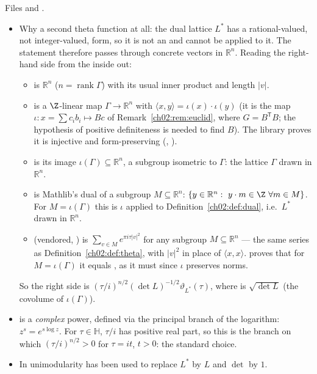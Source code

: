 \begin{dictionary}
Files  and .
\begin{itemize}
\item Why a second theta function at all: the dual lattice $L^*$ has a rational-valued, not
  integer-valued, form, so it is not an  and 
  cannot be applied to it.  The statement therefore passes through concrete vectors in
  $\mathbb{R}^n$.  Reading the right-hand side from the inside out:
  \begin{itemize}
  \item {} is $\mathbb{R}^n$ ($n=\operatorname{rank}\Gamma$)
    with its usual inner product and length $|v|$.
  \item {} is a $\Z$-linear map $\Gamma\to\mathbb{R}^n$ with
    $\langle x,y\rangle=\iota(x)\cdot\iota(y)$ (it is the map $\iota:x=\sum c_ib_i\mapsto Bc$ of
    Remark~\ref{ch02:rem:euclid}, where $G=B^{\mathsf T}B$; the hypothesis  of positive
    definiteness is needed to find $B$).  The library proves it is injective and form-preserving
    (, ).
  \item {} is its image $\iota(\Gamma)\subseteq\mathbb{R}^n$,
    a subgroup isometric to $\Gamma$: the lattice $\Gamma$ drawn in $\mathbb{R}^n$.
  \item {} is Mathlib's dual of a subgroup
    $M\subseteq\mathbb{R}^n$: $\{y\in\mathbb{R}^n:\ y\cdot m\in\Z\ \forall m\in M\}$.  For
    $M=\iota(\Gamma)$ this is $\iota$ applied to Definition~\ref{ch02:def:dual}, i.e.\ $L^*$
    drawn in $\mathbb{R}^n$.
  \item {} (vendored, ) is
    $\sum_{v\in M}e^{\pi i\tau|v|^2}$ for any subgroup $M\subseteq\mathbb{R}^n$ --- the same series
    as Definition~\ref{ch02:def:theta}, with $|v|^2$ in place of $\langle x,x\rangle$.
     proves that for $M=\iota(\Gamma)$ it equals
    , as it must since $\iota$ preserves norms.
  \end{itemize}
  So the right side is $(\tau/i)^{n/2}(\det L)^{-1/2}\vartheta_{L^*}(\tau)$, where
   is $\sqrt{\det L}$ (the covolume of $\iota(\Gamma)$).
\item {} is a \emph{complex} power, defined via the
  principal branch of the logarithm: $z^s=e^{s\log z}$.  For $\tau\in\mathbb{H}$, $\tau/i$ has
  positive real part, so this is the branch on which $(\tau/i)^{n/2}>0$ for $\tau=it$, $t>0$: the
  standard choice.
\item In  unimodularity has been used to replace $L^*$ by $L$ and $\det$
  by $1$.
\end{itemize}
\end{dictionary}
